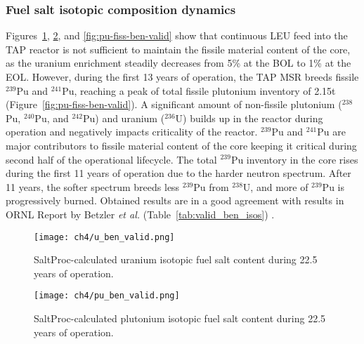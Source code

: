 \subsubsection{Fuel salt isotopic composition dynamics}
Figures~\ref{fig:u-ben-valid}, \ref{fig:pu-ben-valid}, and 
\ref{fig:pu-fiss-ben-valid} show that continuous \gls{LEU} feed into the 
\gls{TAP} 
reactor is not sufficient to maintain the fissile material content of the 
core, as the uranium enrichment steadily decreases from 5\% at the \gls{BOL} 
to 1\% at the \gls{EOL}. However, during the first 13 years of operation, 
the \gls{TAP} \gls{MSR} breeds fissile $^{239}$Pu and $^{241}$Pu, reaching a 
peak of total fissile plutonium inventory of 2.15t  
(Figure~\ref{fig:pu-fiss-ben-valid}). A significant amount of non-fissile 
plutonium ($^{238}$Pu, $^{240}$Pu, and $^{242}$Pu) and uranium ($^{236}$U) 
builds up in the reactor during operation and negatively impacts criticality 
of the reactor. $^{239}$Pu and $^{241}$Pu are major contributors to fissile 
material content of the core keeping it critical during second half of 
the operational lifecycle. The total $^{239}$Pu inventory in the core rises 
during the first 11 years of operation due to the harder neutron spectrum. 
After 11 years, the softer spectrum breeds less $^{239}$Pu from $^{238}$U, and 
more of $^{239}$Pu is progressively burned. Obtained results are in a good 
agreement with results in ORNL Report by Betzler \emph{et al.} 
(Table~\ref{tab:valid_ben_isos}) \cite{betzler_assessment_2017-1}.

\begin{figure}[hbp!] %
	\centering
	\texttt{[image: ch4/u\_ben\_valid.png]}
	\caption{SaltProc-calculated uranium isotopic fuel salt content during 
	22.5 years of operation.}
	\label{fig:u-ben-valid}
\end{figure}
\begin{figure}[hbp!] %
	\centering
	\texttt{[image: ch4/pu\_ben\_valid.png]}
	\caption{SaltProc-calculated plutonium isotopic fuel salt content during 
		22.5 years of operation.}
	\label{fig:pu-ben-valid}
\end{figure}

